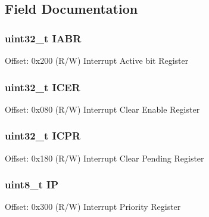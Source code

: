 \subsection{Field Documentation}
\hypertarget{struct_n_v_i_c___type_ab61000be19b0293ea14009224fc34fe3}{
\subsubsection[{I\-A\-B\-R}]{ uint32\-\_\-t I\-A\-B\-R}}\label{struct_n_v_i_c___type_ab61000be19b0293ea14009224fc34fe3}
Offset\-: 0x200 (R/\-W) Interrupt Active bit Register \hypertarget{struct_n_v_i_c___type_a5524644c804c18c22addd691d4da53e4}{
\subsubsection[{I\-C\-E\-R}]{ uint32\-\_\-t I\-C\-E\-R}}\label{struct_n_v_i_c___type_a5524644c804c18c22addd691d4da53e4}
Offset\-: 0x080 (R/\-W) Interrupt Clear Enable Register \hypertarget{struct_n_v_i_c___type_a281c819da5f0f4265f5b88d269544bc9}{
\subsubsection[{I\-C\-P\-R}]{ uint32\-\_\-t I\-C\-P\-R}}\label{struct_n_v_i_c___type_a281c819da5f0f4265f5b88d269544bc9}
Offset\-: 0x180 (R/\-W) Interrupt Clear Pending Register \hypertarget{struct_n_v_i_c___type_a519d82311efa6ead6f53b495d3d80de8}{
\subsubsection[{I\-P}]{ uint8\-\_\-t I\-P}}\label{struct_n_v_i_c___type_a519d82311efa6ead6f53b495d3d80de8}
Offset\-: 0x300 (R/\-W) Interrupt Priority Register

